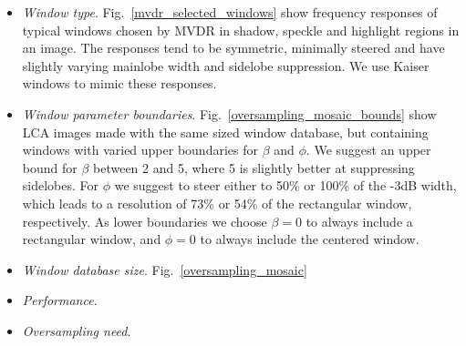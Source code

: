 \documentclass[10pt,journal,draftclsnofoot,onecolumn]{IEEEtran}
\let\MYoriglatexcaption\caption               %
\renewcommand{\caption}[2][\relax]{\MYoriglatexcaption[#2]{#2}}
\newcommand\Fig[1]{Fig.~\ref{#1}}
\newcommand\1{\vec 1}
\begin{document}
\begin{itemize}
\item \emph{Window type}. \Fig{mvdr_selected_windows} show frequency responses of typical windows chosen by MVDR in shadow, speckle and highlight regions in an image. The responses tend to be symmetric, minimally steered and have slightly varying mainlobe width and sidelobe suppression. We use Kaiser windows to mimic these responses.
\item \emph{Window parameter boundaries}. \Fig{oversampling_mosaic_bounds} show LCA images made with the same sized window database, but containing windows with varied upper boundaries for $\beta$ and $\phi$. We suggest an upper bound for $\beta$ between 2 and 5, where 5 is slightly better at suppressing sidelobes. For $\phi$ we suggest to steer either to 50\% or 100\% of the -3dB width, which leads to a resolution of 73\% or 54\% of the rectangular window, respectively. As lower boundaries we choose $\beta=0$ to always include a rectangular window, and $\phi=0$ to always include the centered window.
\item \emph{Window database size}. \Fig{oversampling_mosaic}
\item \emph{Performance}.
\item \emph{Oversampling need}.
\end{itemize}


\end{document}
